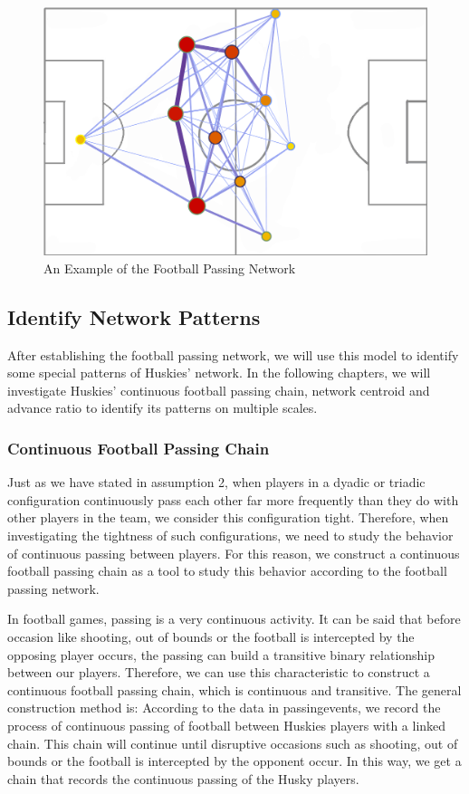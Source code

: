 \documentclass{mcmthesis}
\begin{document}
	\begin{figure}[h]
		\centering
		\includegraphics[width=\textwidth]{figures/playground.png}
		\caption{An Example of the Football Passing Network}
		\label{fig:playground}
	\end{figure}
\subsection{Identify Network Patterns}
	After establishing the football passing network, we will use this model to identify some special patterns of Huskies' network.  In the following chapters, we will investigate Huskies' continuous football passing chain, network centroid and advance ratio to identify its patterns on multiple scales. 
\subsubsection{Continuous Football Passing Chain}
	Just as we have stated in assumption 2, when players in a dyadic or triadic configuration continuously pass each other far more frequently than they do with other players in the team, we consider this configuration tight.  Therefore, when investigating the tightness of such configurations, we need to study the behavior of continuous passing between players.  For this reason, we construct a continuous football passing chain as a tool to study this behavior according to the football passing network.

	In football games, passing is a very continuous activity.  It can be said that before occasion like shooting, out of bounds or the football is intercepted by the opposing player occurs, the passing can build a transitive binary relationship between our players.  Therefore, we can use this characteristic to construct a continuous football passing chain, which is continuous and transitive.  The general construction method is: According to the data in passingevents, we record the process of continuous passing of football between Huskies players with a linked chain.  This chain will continue until disruptive occasions such as shooting, out of bounds or the football is intercepted by the opponent occur.  In this way, we get a chain that records the continuous passing of the Husky players.
\end{document}
